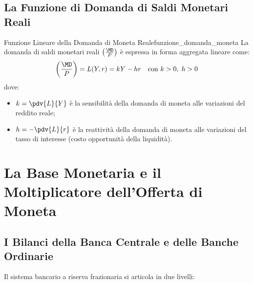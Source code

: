 \subsection{La Funzione di Domanda di Saldi Monetari Reali}

\begin{definizione}{Funzione Lineare della Domanda di Moneta Reale}{funzione_domanda_moneta}
La domanda di saldi monetari reali $\left(\frac{\MD}{P}\right)$ è espressa in forma aggregata lineare come:
\begin{equation}
    \left(\frac{\MD}{P}\right) = L(Y, r) = k Y - h r \quad \text{con } k > 0, \; h > 0
\end{equation}
dove:
\begin{itemize}
    \item $k = \pdv{L}{Y}$ è la sensibilità della domanda di moneta alle variazioni del reddito reale;
    \item $h = -\pdv{L}{r}$ è la reattività della domanda di moneta alle variazioni del tasso di interesse (costo opportunità della liquidità).
\end{itemize}
\end{definizione}

\section{La Base Monetaria e il Moltiplicatore dell'Offerta di Moneta}

\subsection{I Bilanci della Banca Centrale e delle Banche Ordinarie}
Il sistema bancario a riserva frazionaria si articola in due livelli:

